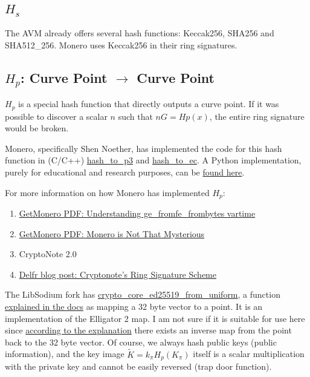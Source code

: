 \documentclass[9pt]{article}
\begin{document}
\subsection{$H_s$}

The AVM already offers several hash functions: Keccak256, SHA256 and SHA512\_256. Monero uses Keccak256 in their ring signatures.

\subsection{$H_p$: Curve Point $\rightarrow$ Curve Point}

$H_p$ is a special hash function that directly outputs a curve point. If it was possible to discover a scalar $n$ such that $n G = Hp(x)$, the entire ring signature would be broken.

Monero, specifically Shen Noether, has implemented the code for this hash function in (C/C++) \href{https://github.com/monero-project/monero/blob/master/src/ringct/rctOps.cpp#L654}{hash\_to\_p3} and \href{https://github.com/monero-project/monero/blob/master/src/crypto/crypto.cpp#L611}{hash\_to\_ec}. A Python implementation, purely for educational and research purposes, can be \href{https://github.com/monero-project/mininero/blob/master/mininero.py#L238}{found here}.

For more information on how Monero has implemented $H_p$:
\begin{enumerate}
    \item \href{https://web.getmonero.org/zh-tw/resources/research-lab/pubs/ge_fromfe.pdf}{GetMonero PDF: Understanding ge\_fromfe\_frombytes vartime}
    \item \href{https://web.getmonero.org/resources/research-lab/pubs/MRL-0003.pdf}{GetMonero PDF: Monero is Not That Mysterious}
    \item CryptoNote 2.0
    \item \href{https://delfr.com/cryptonote-ring-signature/}{Delfr blog post: Cryptonote's Ring Signature Scheme}
\end{enumerate}


The LibSodium fork has \href{https://github.com/algorand/go-algorand/blob/master/crypto/libsodium-fork/src/libsodium/crypto_core/ed25519/core_ed25519.c#L66}{crypto\_core\_ed25519\_from\_uniform}, a function \href{https://libsodium.gitbook.io/doc/advanced/point-arithmetic#elligator-2-map}{explained in the docs} as mapping a 32 byte vector to a point. It is an implementation of the Elligator 2 map. I am not sure if it is suitable for use here since \href{https://elligator.org/map}{according to the explanation} there exists an inverse map from the point back to the 32 byte vector. Of course, we always hash public keys (public information), and the key image $\tilde{K} = k_\pi H_p(K_\pi)$ itself is a scalar multiplication with the private key and cannot be easily reversed (trap door function).
\end{document}

